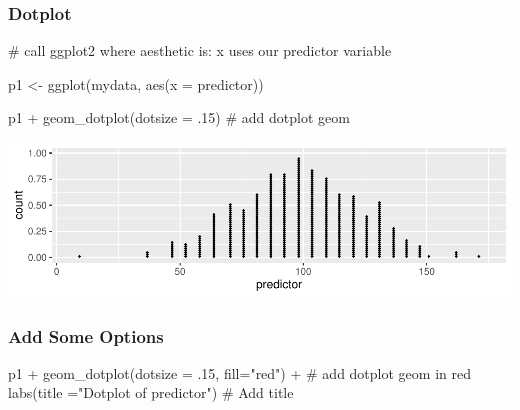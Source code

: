 \documentclass[12pt,]{article}
\newenvironment{Shaded}{}{}
\newcommand{\CommentTok}[1]{\textcolor[rgb]{0.00,0.50,0.00}{#1}}
\newcommand{\DataTypeTok}[1]{#1}
\newcommand{\FloatTok}[1]{#1}
\newcommand{\KeywordTok}[1]{\textcolor[rgb]{0.00,0.00,1.00}{#1}}
\newcommand{\NormalTok}[1]{#1}
\newcommand{\OperatorTok}[1]{#1}
\newcommand{\StringTok}[1]{\textcolor[rgb]{0.00,0.50,0.50}{#1}}
\begin{document}
\hypertarget{dotplot}{%
\subsubsection{Dotplot}\label{dotplot}}

\begin{Shaded}
\begin{Highlighting}[]
\CommentTok{# call ggplot2 where aesthetic is: x uses our predictor variable}

\NormalTok{p1 <-}\StringTok{ }\KeywordTok{ggplot}\NormalTok{(mydata, }
             \KeywordTok{aes}\NormalTok{(}\DataTypeTok{x =}\NormalTok{ predictor)) }
\end{Highlighting}
\end{Shaded}

\begin{Shaded}
\begin{Highlighting}[]
\NormalTok{p1 }\OperatorTok{+}\StringTok{ }
\StringTok{  }\KeywordTok{geom_dotplot}\NormalTok{(}\DataTypeTok{dotsize =} \FloatTok{.15}\NormalTok{) }\CommentTok{# add dotplot geom}
\end{Highlighting}
\end{Shaded}

\includegraphics{introduction-to-ggplot2_files/figure-latex/unnamed-chunk-7-1.pdf}

\hypertarget{add-some-options}{%
\subsubsection{Add Some Options}\label{add-some-options}}

\begin{Shaded}
\begin{Highlighting}[]
\NormalTok{p1 }\OperatorTok{+}\StringTok{ }
\StringTok{  }\KeywordTok{geom_dotplot}\NormalTok{(}\DataTypeTok{dotsize =} \FloatTok{.15}\NormalTok{, }
               \DataTypeTok{fill=}\StringTok{"red"}\NormalTok{) }\OperatorTok{+}\StringTok{ }\CommentTok{# add dotplot geom in red}
\StringTok{  }\KeywordTok{labs}\NormalTok{(}\DataTypeTok{title =}\StringTok{"Dotplot of predictor"}\NormalTok{) }\CommentTok{# Add title}
\end{Highlighting}
\end{Shaded}
\end{document}
